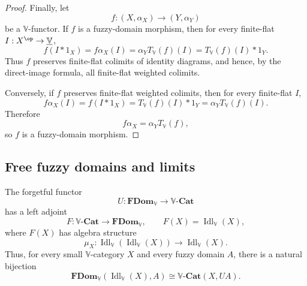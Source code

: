 \begin{proof}
Finally, let
\[
    f:(X,\alpha_X)\to(Y,\alpha_Y)
\]
be a \(\mathbb V\)-functor.  If \(f\) is a fuzzy-domain morphism, then for every
finite-flat \(I:X^{\op}\to\underline{\mathbb V}\),
\[
    f(I*1_X)
    =
    f\alpha_X(I)
    =
    \alpha_YT_{\mathbb V}(f)(I)
    =
    T_{\mathbb V}(f)(I)*1_Y.
\]
Thus \(f\) preserves finite-flat colimits of identity diagrams, and hence, by
the direct-image formula, all finite-flat weighted colimits.

Conversely, if \(f\) preserves finite-flat weighted colimits, then for every
finite-flat \(I\),
\[
    f\alpha_X(I)
    =
    f(I*1_X)
    =
    T_{\mathbb V}(f)(I)*1_Y
    =
    \alpha_YT_{\mathbb V}(f)(I).
\]
Therefore
\[
    f\alpha_X=\alpha_YT_{\mathbb V}(f),
\]
so \(f\) is a fuzzy-domain morphism.
\end{proof}

\subsection{Free fuzzy domains and limits}
\label{subsec:free-fuzzy-domains-limits}

\begin{theorem}
\label{thm:free-fuzzy-domains}
The forgetful functor
\[
    U:\mathbf{FDom}_{\mathbb V}\to \mathbb V\text{-}\mathbf{Cat}
\]
has a left adjoint
\[
    F:\mathbb V\text{-}\mathbf{Cat}\to\mathbf{FDom}_{\mathbb V},
    \qquad
    F(X)=\operatorname{Idl}_{\mathbb V}(X),
\]
where \(F(X)\) has algebra structure
\[
    \mu_X:
    \operatorname{Idl}_{\mathbb V}(\operatorname{Idl}_{\mathbb V}(X))
    \to
    \operatorname{Idl}_{\mathbb V}(X).
\]
Thus, for every small \(\mathbb V\)-category \(X\) and every fuzzy domain \(A\),
there is a natural bijection
\[
    \mathbf{FDom}_{\mathbb V}(\operatorname{Idl}_{\mathbb V}(X),A)
    \cong
    \mathbb V\text{-}\mathbf{Cat}(X,UA).
\]
\end{theorem}

